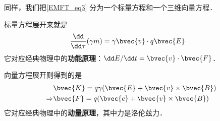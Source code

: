 同样，我们把\autoref{EMFT_eq3} 分为一个标量方程和一个三维向量方程．

标量方程展开来就是
\begin{equation}
\begin{aligned}
&\frac{\dd}{\dd\tau}(\gamma m)=\gamma \bvec{v}\cdot q\bvec{E}
\end{aligned}
\end{equation}
它对应经典物理中的\textbf{功能原理}：$\dd E/\dd t=\bvec{v}\cdot\bvec{F}$．

向量方程展开则得到的是
\begin{equation}
\begin{aligned}
&\bvec{K}=q\gamma(\bvec{E}+\bvec{v}\times\bvec{B})\\
\Rightarrow &\bvec{F}=q(\bvec{e}+\bvec{v}\times\bvec{B})
\end{aligned}
\end{equation}
它对应经典物理中的\textbf{动量原理}，其中力是洛伦兹力．






